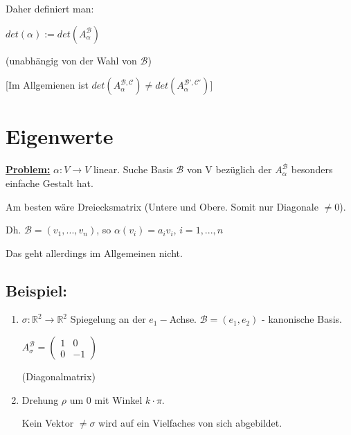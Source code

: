 \documentclass[a4paper, openany]{book}
\begin{document}
        Daher definiert man:

        \begin{center}
          $det(\alpha) := det(A_{\alpha}^{\mathcal{B}})$
        \end{center}

        (unabhängig von der Wahl von $\mathcal{B}$) 

        \par \medskip

        [Im Allgemienen ist $det(A_{\alpha}^{\mathcal{B, C}}) \neq det(A_{\alpha}^{\mathcal{B', C'}})$]

        \chapter{Eigenwerte}

        \textbf{\underline{Problem:}} $\alpha: V \rightarrow V$ linear. Suche Basis $\mathcal{B}$ von V bezüglich der $A_{\alpha}^{\mathcal{B}}$ besonders einfache Gestalt hat. 

        Am besten wäre Dreiecksmatrix (Untere und Obere. Somit nur Diagonale $\neq 0$).

        Dh. $\mathcal{B} = (v_1, ..., v_n)$, so $\alpha(v_i) = a_iv_i$, $i=1, ...,n$ 

        Das geht allerdings im Allgemeinen nicht.

        \section{Beispiel:}

        \begin{enumerate}[label=(\alph*)]

          \item $\sigma : \mathbb{R}^2 \rightarrow \mathbb{R}^2$ Spiegelung an der $e_1-$Achse. $\mathcal{B} = (e_1, e_2)$ - kanonische Basis.

          \begin{center}
            $A_{\sigma}^{\mathcal{B}} = \begin{pmatrix}1 & 0 \\ 0 & -1 \end{pmatrix}$
          \end{center}

          (Diagonalmatrix)

          \item Drehung $\rho$ um 0 mit Winkel  $k \cdot \pi$.

          \par \medskip

          Kein Vektor $\neq \sigma$ wird auf ein Vielfaches von sich abgebildet.
        \end{enumerate}
\end{document}
